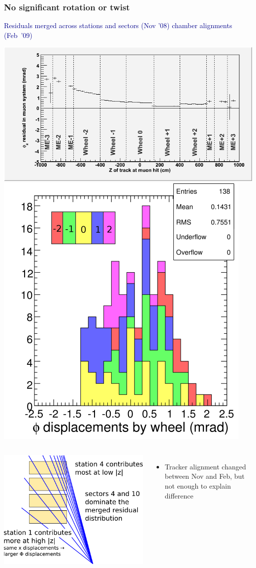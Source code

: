 \documentclass[compress]{beamer}
\begin{document}
\begin{frame}
\frametitle{No significant rotation or twist}
\textcolor{darkblue}{Residuals merged across stations and sectors (Nov '08)} \hfill \textcolor{darkblue}{chamber alignments \mbox{(Feb '09)\hspace{-0.4 cm}}}

\includegraphics[height=3.7 cm]{phiresid_from_muon.png} \hfill \includegraphics[height=3.7 cm]{report2_phibywheel.png}

\vfill
\begin{columns}
\includegraphics[width=\linewidth]{merged_residuals_mix_chambers.pdf}

\begin{itemize}
\item Tracker alignment changed between Nov and Feb, but not enough to
  explain difference


\end{itemize}
\end{columns}
\end{frame}
\end{document}
